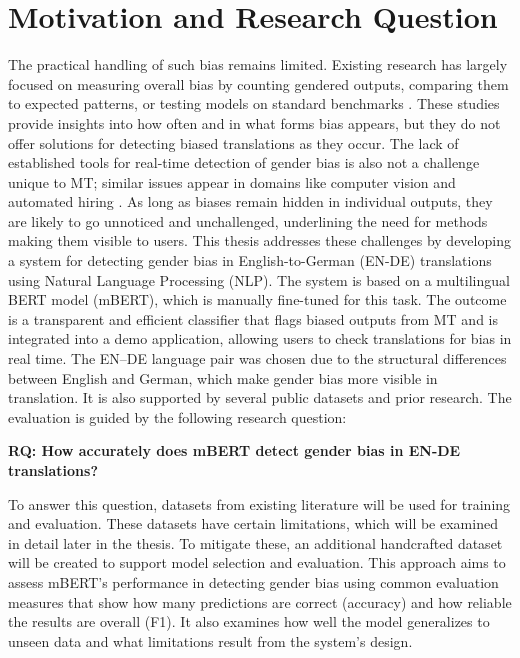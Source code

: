 \section{Motivation and Research Question}
    The practical handling of such bias remains limited. Existing research has largely focused on measuring overall bias by counting gendered outputs, comparing them to expected patterns, or testing models on standard benchmarks \parencite{rescignoGenderBiasMachine2023,barclayInvestigatingMarkersDrivers2024a,pratesAssessingGenderBias2019,savoldiWhatHarmQuantifying2024}. These studies provide insights into how often and in what forms bias appears, but they do not offer solutions for detecting biased translations as they occur. The lack of established tools for real-time detection of gender bias is also not a challenge unique to MT; similar issues appear in domains like computer vision and automated hiring \parencite{schwemmerDiagnosingGenderBias2020}. As long as biases remain hidden in individual outputs, they are likely to go unnoticed and unchallenged, underlining the need for methods making them visible to users. This thesis addresses these challenges by developing a system for detecting gender bias in English-to-German (EN-DE) translations using Natural Language Processing (NLP). The system is based on a multilingual BERT model (mBERT), which is manually fine-tuned for this task. The outcome is a transparent and efficient classifier that flags biased outputs from MT and is integrated into a demo application, allowing users to check translations for bias in real time. The EN–DE language pair was chosen due to the structural differences between English and German, which make gender bias more visible in translation. It is also supported by several public datasets and prior research. The evaluation is guided by the following research question:

    \vspace{0.8em}
    \noindent \textbf{RQ: How accurately does mBERT detect gender bias in EN-DE translations?}

    \vspace{0.8em}

    \noindent To answer this question, datasets from existing literature will be used for training and evaluation. These datasets have certain limitations, which will be examined in detail later in the thesis. To mitigate these, an additional handcrafted dataset will be created to support model selection and evaluation. This approach aims to assess mBERT's performance in detecting gender bias using common evaluation measures that show how many predictions are correct (accuracy) and how reliable the results are overall (F1). It also examines how well the model generalizes to unseen data and what limitations result from the system's design.

